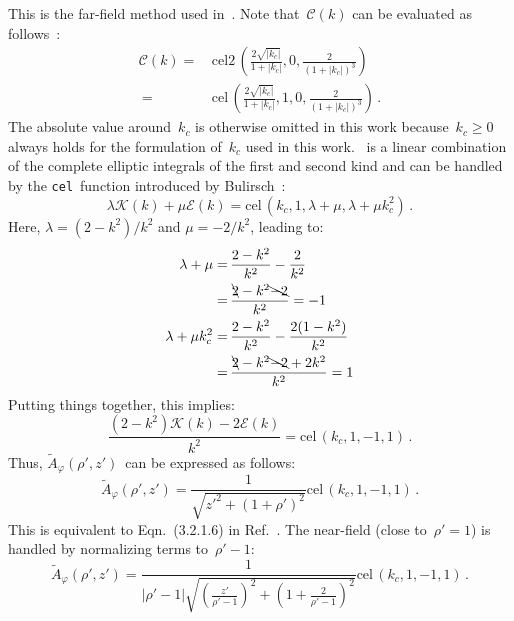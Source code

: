 This is the far-field method used in~.
Note that~$\mathcal{C}(k)$ can be evaluated as follows~\cite{bulirsch_1, bulirsch_3}:
\begin{align}
  \mathcal{C}(k) =&\, \textrm{cel2}\,\left(\frac{2 \sqrt{|k_c|}}{1+|k_c|},0,\frac{2}{(1+|k_c|)^3}\right) \nonumber \\
       ~         =&\, \textrm{cel}\,\left(\frac{2 \sqrt{|k_c|}}{1+|k_c|},1,0,\frac{2}{(1+|k_c|)^3}\right) \, .
\end{align}
The absolute value around~$k_c$ is otherwise omitted in this work
because~$k_c \geq 0$ always holds for the formulation of~$k_c$ used in this work.
~is a linear combination of the complete elliptic integrals
of the first and second kind and can be handled by the \texttt{cel}~function
introduced by Bulirsch~\cite{bulirsch_3}:
\begin{equation}
  \lambda \mathcal{K} (k) + \mu \mathcal{E} (k) = \textrm{cel}\,(k_c, 1, \lambda + \mu, \lambda + \mu k_c^2) \, .
\end{equation}
Here, $\lambda = (2 - k^2)/k^2$ and $\mu = -2/k^2$,
leading to:
\begin{align}
  \lambda + \mu       =&\, \frac{2 - k^2}{k^2} - \frac{2}{k^2} \nonumber \\
      ~               =&\, \frac{\bcancel{2} - k^2 \bcancel{-2}}{k^2} = -1 \nonumber \\
  \lambda + \mu k_c^2 =&\, \frac{2 - k^2}{k^2} - \frac{2 (1 - k^2)}{k^2} \nonumber \\
      ~               =&\, \frac{\bcancel{2} - k^2 \bcancel{-2} + 2 k^2}{k^2} = 1
\end{align}
Putting things together, this implies:
\begin{equation}
 \frac{(2 - k^2)\mathcal{K}(k) - 2 \mathcal{E}(k)}{k^2} = \textrm{cel}\,(k_c, 1, -1, 1) \, . \label{eqn:cel_kc_1}
\end{equation}
Thus, $\tilde{A}_\varphi(\rho',z')$~can be expressed as follows:
\begin{equation}
 \tilde{A}_\varphi(\rho',z')
 = \frac{1}{\sqrt{z'^2 + (1 + \rho')^2}}
   \textrm{cel}\,(k_c, 1, -1, 1) \, . \label{eqn:cwl_A_phi_using_cel}
\end{equation}
This is equivalent to Eqn.~(3.2.1.6) in Ref.~\cite{teal}.
The near-field (close to~$\rho' = 1$) is handled by normalizing terms to~$\rho'-1$:
\begin{equation}
 \tilde{A}_\varphi(\rho',z')
 = \frac{1}{|\rho'-1| \sqrt{\left(\frac{z'}{\rho'-1}\right)^2 + \left(1 + \frac{2}{\rho'-1}\right)^2}}
   \textrm{cel}\,(k_c, 1, -1, 1) \label{eqn:cwl_A_phi_near} \, .
\end{equation}
